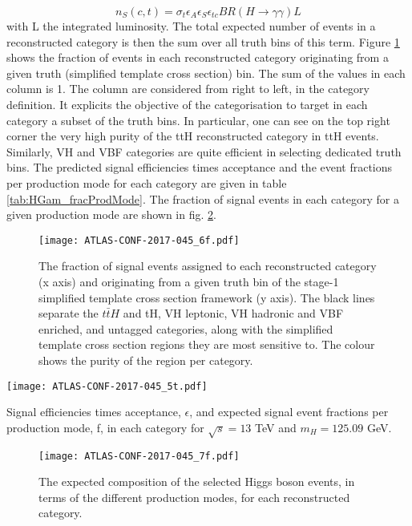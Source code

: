 \begin{equation}
n_S (c, t) = \sigma_{t}\epsilon_A\epsilon_S \epsilon_{tc} BR(H\rightarrow\gamma\gamma) L
\end{equation}
with L the integrated luminosity.
The total expected number of events in a reconstructed category is then the sum over all truth bins of this term.
Figure \ref{fig:orgc7e9fde} shows the fraction of events in each reconstructed category originating from a given truth (simplified template cross section) bin.
The sum of the values in each column is 1.
The column are considered from right to left, in the category definition.
It explicits the objective of the categorisation to target in each category a subset of the truth bins.
In particular, one can see on the top right corner the very high purity of the ttH reconstructed category in ttH events.
Similarly, VH and VBF categories are quite efficient in selecting dedicated truth bins.
The predicted signal efficiencies times acceptance and the event fractions per production mode for each category are given in table \ref{tab:HGam_fracProdMode}.
The fraction of signal events in each category for a given production mode are shown in fig. \ref{fig:HGam_fracProdMode}.

\begin{figure}[htbp]
\centering
\texttt{[image: ATLAS-CONF-2017-045\_6f.pdf]}
\caption{\label{fig:orgc7e9fde}
  The fraction of signal events assigned to each reconstructed category (x axis) and originating from a given truth bin of the stage-1 simplified template cross section framework (y axis).
  The black lines separate the $t\bar{t}H$ and tH, VH leptonic, VH hadronic and VBF enriched, and untagged categories, along with the simplified template cross section regions they are most sensitive to.
  The colour shows the purity of the region per category.
  \cite{ATLAS-CONF-2017-045}}
\end{figure}

\begin{sidewaystable}[htbp]
\centering
\texttt{[image: ATLAS-CONF-2017-045\_5t.pdf]}
\caption{\label{tab:HGam_fracProdMode}
  Signal efficiencies times acceptance, $\epsilon$, and expected signal event fractions per production mode, f, in each  category for $\sqrt{s} = 13$ TeV and $m_H = 125.09$ GeV.
  \cite{ATLAS-CONF-2017-045}}
\end{sidewaystable}

\begin{figure}[htbp]
\centering
\texttt{[image: ATLAS-CONF-2017-045\_7f.pdf]}
\caption{\label{fig:HGam_fracProdMode}
  The expected composition of the selected Higgs boson events, in terms of the different production modes, for each reconstructed category.\cite{ATLAS-CONF-2017-045}}
\end{figure}

